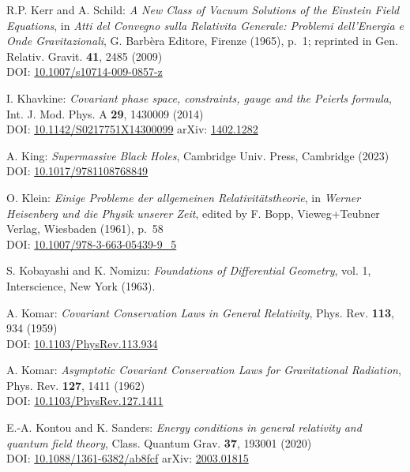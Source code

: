 \begin{thebibliography}{123}
R.P. Kerr and A. Schild:
{\em A New Class of Vacuum Solutions of the Einstein Field Equations},
in {\em Atti del Convegno sulla Relativita Generale: Problemi
dell’Energia e Onde Gravitazionali}, G. Barbèra Editore,
Firenze (1965), p.~1; reprinted in
Gen. Relativ. Gravit. {\bf 41}, 2485 (2009)\\
DOI: \href{https://doi.org/10.1007/s10714-009-0857-z}{10.1007/s10714-009-0857-z}

I. Khavkine:
{\em Covariant phase space, constraints, gauge and the Peierls formula},
Int. J. Mod. Phys. A  {\bf 29}, 1430009 (2014)\\
DOI: \href{https://doi.org/10.1142/S0217751X14300099}{10.1142/S0217751X14300099}\hfill
arXiv: \href{https://arxiv.org/abs/1402.1282}{1402.1282}

A. King:
{\em Supermassive Black Holes},
Cambridge Univ. Press, Cambridge (2023)\\
DOI: \href{https://doi.org/10.1017/9781108768849}{10.1017/9781108768849}

O. Klein:
{\em Einige Probleme der allgemeinen Relativitätstheorie},
in {\em Werner Heisenberg und die Physik unserer Zeit},
edited by F. Bopp, Vieweg+Teubner Verlag, Wiesbaden (1961), p.~58\\
DOI: \href{https://doi.org/10.1007/978-3-663-05439-9_5}{10.1007/978-3-663-05439-9\_5}

S. Kobayashi and K. Nomizu:
{\em Foundations of Differential Geometry}, vol. 1,
Interscience, New York (1963).

A. Komar:
{\em Covariant Conservation Laws in General Relativity},
Phys. Rev. {\bf 113}, 934 (1959)\\
DOI: \href{https://doi.org/10.1103/PhysRev.113.934}{10.1103/PhysRev.113.934}

A. Komar:
{\em Asymptotic Covariant Conservation Laws for Gravitational Radiation},
Phys. Rev. {\bf 127}, 1411 (1962)\\
DOI: \href{https://doi.org/10.1103/PhysRev.127.1411}{10.1103/PhysRev.127.1411}

E.-A. Kontou and K. Sanders:
{\em Energy conditions in general relativity and quantum field theory},
Class. Quantum Grav. {\bf 37}, 193001 (2020)\\
DOI: \href{https://doi.org/10.1088/1361-6382/ab8fcf}{10.1088/1361-6382/ab8fcf}\hfill
arXiv: \href{https://arxiv.org/abs/2003.01815}{2003.01815}


\end{thebibliography}
